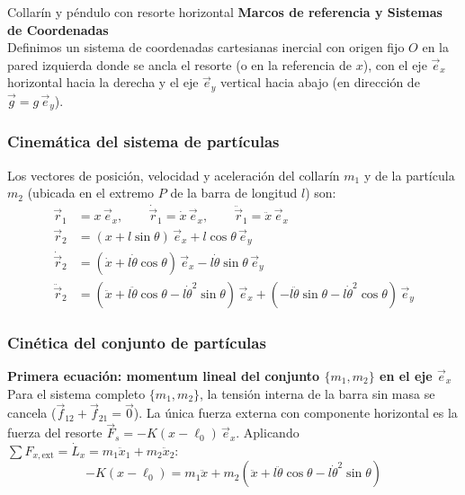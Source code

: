 \begin{solucion}{Collarín y péndulo con resorte horizontal}
\textbf{Marcos de referencia y Sistemas de Coordenadas}\\
Definimos un sistema de coordenadas cartesianas inercial con origen fijo $O$ en la pared izquierda donde se ancla el resorte (o en la referencia de $x$), con el eje $\vec{e}_x$ horizontal hacia la derecha y el eje $\vec{e}_y$ vertical hacia abajo (en dirección de $\vec{g} = g\,\vec{e}_y$).

\subsubsection*{Cinemática del sistema de partículas}
Los vectores de posición, velocidad y aceleración del collarín $m_1$ y de la partícula $m_2$ (ubicada en el extremo $P$ de la barra de longitud $l$) son:
$$\begin{aligned}
    \vec{r}_1 &= x\,\vec{e}_x, \qquad \dot{\vec{r}}_1 = \dot{x}\,\vec{e}_x, \qquad \ddot{\vec{r}}_1 = \ddot{x}\,\vec{e}_x \\
    \vec{r}_2 &= (x + l\sin\theta)\,\vec{e}_x + l\cos\theta\,\vec{e}_y \\
    \dot{\vec{r}}_2 &= (\dot{x} + l\dot{\theta}\cos\theta)\,\vec{e}_x - l\dot{\theta}\sin\theta\,\vec{e}_y \\
    \ddot{\vec{r}}_2 &= (\ddot{x} + l\ddot{\theta}\cos\theta - l\dot{\theta}^2\sin\theta)\,\vec{e}_x + (-l\ddot{\theta}\sin\theta - l\dot{\theta}^2\cos\theta)\,\vec{e}_y
\end{aligned}$$

\subsubsection*{Cinética del conjunto de partículas}
\textbf{Primera ecuación: momentum lineal del conjunto $\{m_1, m_2\}$ en el eje $\vec{e}_x$}\\
Para el sistema completo $\{m_1, m_2\}$, la tensión interna de la barra sin masa se cancela ($\vec{f}_{12} + \vec{f}_{21} = \vec{0}$). La única fuerza externa con componente horizontal es la fuerza del resorte $\vec{F}_s = -K(x - \ell_0)\,\vec{e}_x$. Aplicando $\sum F_{x,\text{ext}} = \dot{L}_x = m_1 \ddot{x}_1 + m_2 \ddot{x}_2$:
$$-K(x - \ell_0) = m_1 \ddot{x} + m_2 (\ddot{x} + l\ddot{\theta}\cos\theta - l\dot{\theta}^2\sin\theta)$$


\end{solucion}
